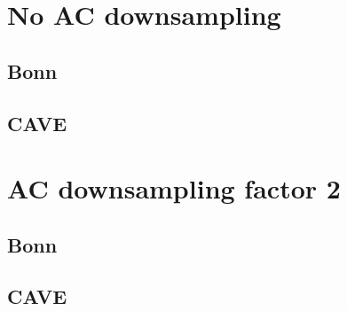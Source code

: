 \documentclass{article}
\begin{document}
% 

\tableofcontents
\clearpage

\section{No AC downsampling}

\subsection{Bonn}



\subsection{CAVE}




\section{AC downsampling factor 2}

\subsection{Bonn}



\subsection{CAVE}


\end{document}
